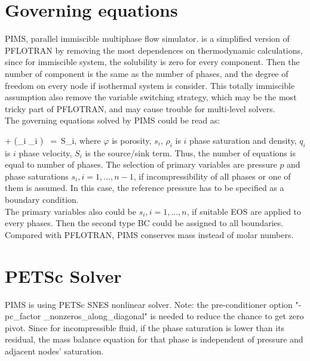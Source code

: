 \documentclass[12pt]{article}
\def\EQ#1\EN{\begin{equation}#1\end{equation}}
\newcommand{\eq}{\ =\ }
\newcommand{\p}{{\partial}}
\newcommand{\bnabla}{\boldsymbol{\nabla}}
\newcommand{\bq}{\boldsymbol{q}}
\begin{document}
\normalsize

\clearpage

\tableofcontents

\listoffigures

\listoftables

\clearpage




\section{Governing equations}
PIMS, parallel immiscible multiphase flow simulator. is a simplified version of PFLOTRAN
by removing the most dependences on thermodynamic calculations, since for immiscible system, the solubility is zero for every component. Then the number of component is the same as the number of phases,  and the degree of freedom on every node if isothermal system is consider. This totally immiscible assumption also remove the variable switching strategy, which may be the most tricky part of PFLOTRAN, and may cause trouble for multi-level solvers. \\
The governing equations solved by PIMS could be read as:

\EQ\label{mass}
\frac{\p}{\p t} + \bnabla\cdot \bigg(\rho_i  \bq_i \bigg) \eq S_i,
\EN
where $\varphi$ is porosity,  $s_i$, $\rho_i$ is $i$ phase saturation and density, $q_i$ is $i$ phase velocity, $S_i$ is the source/sink term. Thus, the number of equations is equal to number of phases. 
The selection of primary variables are pressure $p$ and phase saturations $s_i, i=1,...,n-1$, if incompressibility of all phases or one of them is assumed. In this case, the reference pressure has to be specified as a boundary condition.\\ 
The primary variables also could be $s_i, i=1,...,n$, if suitable EOS are applied to every phases. Then the second type BC could be assigned to all boundaries.
Compared with PFLOTRAN, PIMS conserves mass instead of molar numbers. 

\section{PETSc Solver}
PIMS is using PETSc SNES nonlinear solver. 
Note: the pre-conditioner option "-pc\_factor \_nonzeros\_along\_diagonal" is needed to reduce the chance to get zero pivot. Since for incompressible fluid, if the phase saturation is lower than its residual, the mass balance equation for that phase is independent of pressure and adjacent nodes' saturation. 
\end{document}

